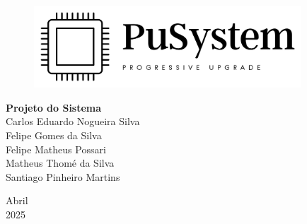 \documentclass[a4paper, 12pt]{article}
\begin{document}

\begin{titlepage}
	\begin{center}
	
	\begin{figure}[!ht]
	\centering
	\includegraphics[width=10cm]{dist/LogoTransparentePreto.png} \\ 
    \end{figure}

        
		\vspace{115pt}
        \textbf{\Huge{Projeto do Sistema}}\\
        
		\vspace{115pt}
        Carlos Eduardo Nogueira Silva \\
        Felipe Gomes da Silva \\
        Felipe Matheus Possari \\
        Matheus Thomé da Silva\\ 
        Santiago Pinheiro Martins \\
	\end{center}
	
	
	\vspace{1cm}
	\begin{center}
		\vspace{\fill}
		 Abril \\
		 2025
			\end{center}
\end{titlepage}


\newpage
\thispagestyle{empty}
\tableofcontents

\newpage
\pagestyle{fancy}

\fancyhead[L]{\thepage}
\fancyhead[C]{\nouppercase{\leftmark}}
\fancyfoot[R]{}
\fancyfoot[L]{}
\setlength\headheight{26pt}
\end{document}

